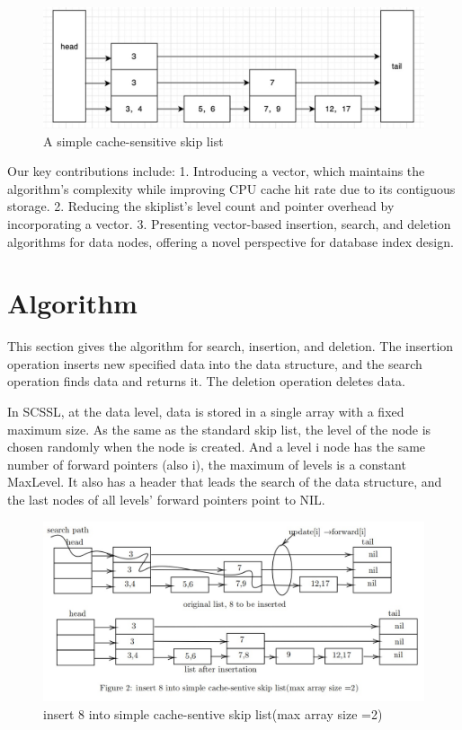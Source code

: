 \documentclass[sigconf, nonacm, letterpaper,top=2cm,bottom=2cm,left=3cm,right=3cm,marginparwidth=1.75cm]{acmart}
\begin{document}
\begin{figure}
  \centering
  \includegraphics[width=\linewidth]{figures/skiplist.png}
\caption{A simple cache-sensitive skip list}
  \label{fig:skiplist}
\end{figure}

Our key contributions include: 1. Introducing a vector, which maintains the algorithm's complexity while improving CPU cache hit rate due to its contiguous storage. 2. Reducing the skiplist's level count and pointer overhead by incorporating a vector. 3. Presenting vector-based insertion, search, and deletion algorithms for data nodes, offering a novel perspective for database index design.

\section{Algorithm}
This section gives the algorithm for search, insertion, and deletion. The insertion operation inserts new specified data into the data structure, and the search operation finds data and returns it. The deletion operation deletes data. 

In SCSSL, at the data level, data is stored in a single array with a fixed maximum size. As the same as the standard skip list, the level of the node is chosen randomly when the node is created. And a level i node has the same number of forward pointers (also i), the maximum of levels is a constant MaxLevel. It also has a header that leads the search of the data structure, and the last nodes of all levels’ forward pointers point to NIL.


\begin{figure}
      \centering
  \includegraphics[width=\linewidth]{figures/skipinsert.jpg}
\caption{insert 8 into simple cache-sentive skip list(max array size =2)}
\label{fig:fig2}
\end{figure}
\end{document}

